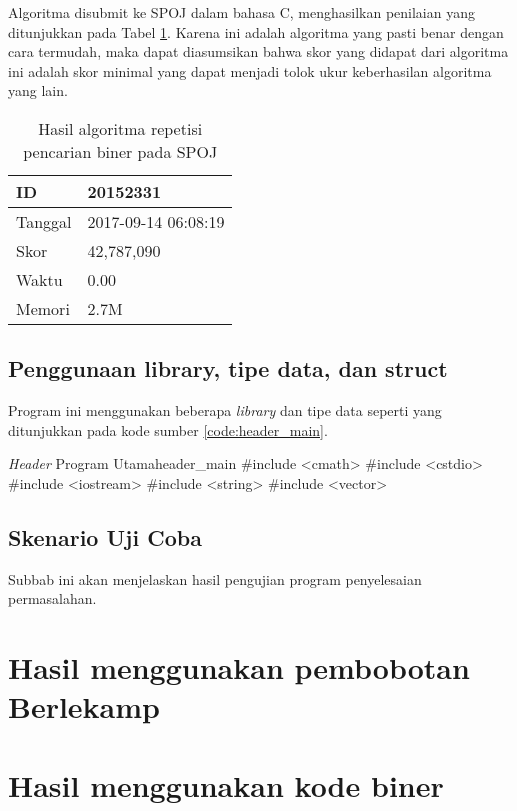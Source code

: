 Algoritma disubmit ke SPOJ dalam bahasa C, menghasilkan penilaian yang ditunjukkan pada Tabel \ref{tab:score_repetitive}. Karena ini adalah algoritma yang pasti benar dengan cara termudah, maka dapat diasumsikan bahwa skor yang didapat dari algoritma ini adalah skor minimal yang dapat menjadi tolok ukur keberhasilan algoritma yang lain.

\begin{table}[h!]
\caption{Hasil algoritma repetisi pencarian biner pada SPOJ}
\label{tab:score_repetitive}
\begin{center}
\begin{tabular} {|l|l|}
\hline
ID & 20152331 \\
\hline
Tanggal & 2017-09-14 06:08:19 \\
\hline
Skor & 42,787,090 \\
\hline
Waktu & 0.00 \\
\hline
Memori & 2.7M \\
\hline
\end{tabular}
\end{center}
\end{table}

\subsection{Penggunaan library, tipe data, dan struct}

Program ini menggunakan beberapa \textit{library} dan tipe data seperti yang ditunjukkan pada kode sumber \ref{code:header_main}.

\begin{code}[firstnumber=1,float]{\textit{Header} Program Utama}{header_main}
#include <cmath>
#include <cstdio>
#include <iostream>
#include <string>
#include <vector>
\end{code}

\subsection{Skenario Uji Coba}

Subbab ini akan menjelaskan hasil pengujian program penyelesaian permasalahan.

\section{Hasil menggunakan pembobotan Berlekamp}

\section{Hasil menggunakan kode biner}
